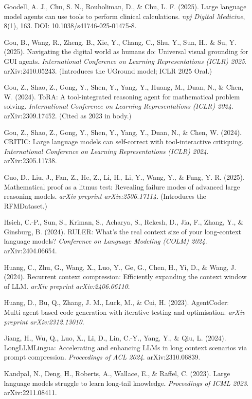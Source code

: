 \documentclass[
]{article}
\begin{document}
Goodell, A. J., Chu, S. N., Rouholiman, D., \& Chu, L. F. (2025). Large
language model agents can use tools to perform clinical calculations.
\emph{npj Digital Medicine}, 8(1), 163. DOI: 10.1038/s41746-025-01475-8.

Gou, B., Wang, R., Zheng, B., Xie, Y., Chang, C., Shu, Y., Sun, H., \&
Su, Y. (2025). Navigating the digital world as humans do: Universal
visual grounding for GUI agents. \emph{International Conference on
Learning Representations (ICLR) 2025}. arXiv:2410.05243. (Introduces the
UGround model; ICLR 2025 Oral.)

Gou, Z., Shao, Z., Gong, Y., Shen, Y., Yang, Y., Huang, M., Duan, N., \&
Chen, W. (2024). ToRA: A tool-integrated reasoning agent for
mathematical problem solving. \emph{International Conference on Learning
Representations (ICLR) 2024}. arXiv:2309.17452. (Cited as 2023 in body.)

Gou, Z., Shao, Z., Gong, Y., Shen, Y., Yang, Y., Duan, N., \& Chen, W.
(2024). CRITIC: Large language models can self-correct with
tool-interactive critiquing. \emph{International Conference on Learning
Representations (ICLR) 2024}. arXiv:2305.11738.

Guo, D., Liu, J., Fan, Z., He, Z., Li, H., Li, Y., Wang, Y., \& Fung, Y.
R. (2025). Mathematical proof as a litmus test: Revealing failure modes
of advanced large reasoning models. \emph{arXiv preprint
arXiv:2506.17114}. (Introduces the RFMDataset.)

Hsieh, C.-P., Sun, S., Kriman, S., Acharya, S., Rekesh, D., Jia, F.,
Zhang, Y., \& Ginsburg, B. (2024). RULER: What's the real context size
of your long-context language models? \emph{Conference on Language
Modeling (COLM) 2024}. arXiv:2404.06654.

Huang, C., Zhu, G., Wang, X., Luo, Y., Ge, G., Chen, H., Yi, D., \&
Wang, J. (2024). Recurrent context compression: Efficiently expanding
the context window of LLM. \emph{arXiv preprint arXiv:2406.06110}.

Huang, D., Bu, Q., Zhang, J. M., Luck, M., \& Cui, H. (2023).
AgentCoder: Multi-agent-based code generation with iterative testing and
optimisation. \emph{arXiv preprint arXiv:2312.13010}.

Jiang, H., Wu, Q., Luo, X., Li, D., Lin, C.-Y., Yang, Y., \& Qiu, L.
(2024). LongLLMLingua: Accelerating and enhancing LLMs in long context
scenarios via prompt compression. \emph{Proceedings of ACL 2024}.
arXiv:2310.06839.

Kandpal, N., Deng, H., Roberts, A., Wallace, E., \& Raffel, C. (2023).
Large language models struggle to learn long-tail knowledge.
\emph{Proceedings of ICML 2023}. arXiv:2211.08411.
\end{document}
